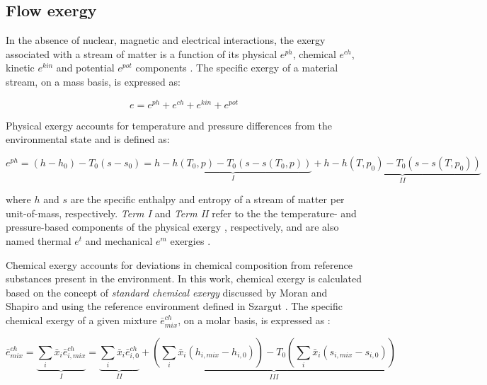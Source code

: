 \documentclass[times,3p]{elsarticle}
\begin{document}
\subsection{Flow exergy}

In the absence of nuclear, magnetic and electrical interactions, the exergy associated with a stream of matter is a function of its physical $e^{ph}$, chemical $e^{ch}$, kinetic $e^{kin}$ and potential $e^{pot}$ components \cite{BejanAdrian;TsatsaronisGeorge;Moran1996}. The specific exergy of a material stream, on a mass basis, is expressed as:

		
	\begin{equation}
		e=e^{ph}+e^{ch}+e^{kin}+e^{pot}
	\end{equation}

Physical exergy accounts for temperature and pressure differences from the environmental state and is defined as:  
		
	\begin{equation}
		e^{ph}=(h-h_0)-T_0(s-s_0)=\underbrace{h-h(T_0,p)-T_0\left(s-s(T_0,p)\right)}_{I}+\underbrace{h-h(T,p_0)-T_0\left(s-s(T,p_0)\right)}_{II}
	\end{equation}
	
	where $h$ and $s$ are the specific enthalpy and entropy of a stream of matter per unit-of-mass, respectively. \emph{Term I} and \emph{Term II} refer to the the temperature- and pressure-based components of the physical exergy \cite{Kotas1995}, respectively, and are also named thermal $e^{t}$ and mechanical $e^{m}$ exergies \cite{Tsatsaronis1993}.


Chemical exergy accounts for deviations in chemical composition from reference substances present in the environment. In this work, chemical exergy is calculated based on the concept of \emph{standard chemical exergy} discussed by Moran and Shapiro \cite{Moran2007} and using the reference environment defined in Szargut \cite{Szargut1988,Szargut1989,Morris1986}. The specific chemical exergy of a given mixture $\bar{e}^{ch}_{mix}$, on a molar basis, is expressed as \cite{Sato2004}:

\begin{equation*}
	\bar{e}^{ch}_{mix}=\underbrace{\sum_i \bar{x}_i \bar{e}^{ch}_{i,mix}}_{I}=\underbrace{\sum_i \bar{x}_i \bar{e}^{ch}_{i,0}}_{II}+\underbrace{\left(\sum_i \bar{x}_i \left(h_{i,mix}-h_{i,0}\right)\right)-T_0\left(\sum_i \bar{x}_i \left(s_{i,mix}-s_{i,0}\right)\right)}_{III}
\end{equation*}
\end{document}

